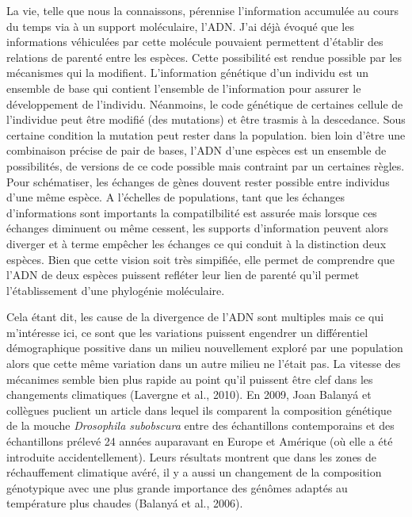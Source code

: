 La vie, telle que nous la connaissons, pérennise l'information accumulée
au cours du temps via à un support moléculaire, l'ADN. J'ai déjà évoqué
que les informations véhiculées par cette molécule pouvaient permettent
d'établir des relations de parenté entre les espèces. Cette possibilité
est rendue possible par les mécanismes qui la modifient. L'information
génétique d'un individu est un ensemble de base qui contient l'ensemble
de l'information pour assurer le développement de l'individu. Néanmoins,
le code génétique de certaines cellule de l'individue peut être modifié
(des mutations) et être trasmis à la descedance. Sous certaine condition
la mutation peut rester dans la population. bien loin d'être une
combinaison précise de pair de bases, l'ADN d'une espèces est un
ensemble de possibilités, de versions de ce code possible mais contraint
par un certaines règles. Pour schématiser, les échanges de gènes douvent
rester possible entre individus d'une même espèce. A l'échelles de
populations, tant que les échanges d'informations sont importants la
compatilbilité est assurée mais lorsque ces échanges diminuent ou même
cessent, les supports d'information peuvent alors diverger et à terme
empêcher les échanges ce qui conduit à la distinction deux espèces. Bien
que cette vision soit très simpifiée, elle permet de comprendre que
l'ADN de deux espèces puissent refléter leur lien de parenté qu'il
permet l'établissement d'une phylogénie moléculaire.

Cela étant dit, les cause de la divergence de l'ADN sont multiples mais
ce qui m'intéresse ici, ce sont que les variations puissent engendrer un
différentiel démographique possitive dans un milieu nouvellement exploré
par une population alors que cette même variation dans un autre milieu
ne l'était pas. La vitesse des mécanimes semble bien plus rapide au
point qu'il puissent être clef dans les changements climatiques
(Lavergne et al., 2010). En 2009, Joan Balanyá et collègues puclient un
article dans lequel ils comparent la composition génétique de la mouche
\emph{Drosophila subobscura} entre des échantillons contemporains et des
échantillons prélevé 24 années auparavant en Europe et Amérique (où elle
a été introduite accidentellement). Leurs résultats montrent que dans
les zones de réchauffement climatique avéré, il y a aussi un changement
de la composition génotypique avec une plus grande importance des
génômes adaptés au température plus chaudes (Balanyá et al., 2006).


